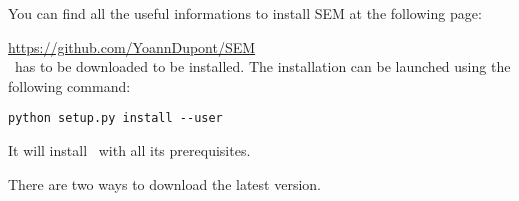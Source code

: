 \documentclass[manual-fr.tex]{subfiles}
\begin{document}
You can find all the useful informations to install SEM at the following page:

\url{https://github.com/YoannDupont/SEM} \\

\SEM\ has to be downloaded to be installed. The installation can be launched using the following command:

\begin{lstlisting}[style=pieceofcode,frame=single]
python setup.py install --user
\end{lstlisting}

It will install \SEM\ with all its prerequisites.

There are two ways to download the latest version.
\end{document}
